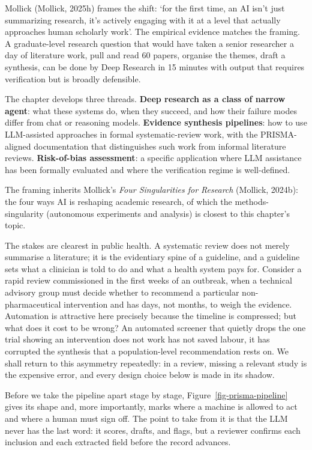 \documentclass[
  letterpaper,
  11pt]{scrbook}
\begin{document}
Mollick (Mollick, 2025h) frames the shift: `for the first time, an AI
isn't just summarizing research, it's actively engaging with it at a
level that actually approaches human scholarly work'. The empirical
evidence matches the framing. A graduate-level research question that
would have taken a senior researcher a day of literature work, pull and
read 60 papers, organise the themes, draft a synthesis, can be done by
Deep Research in 15 minutes with output that requires verification but
is broadly defensible.

The chapter develops three threads. \textbf{Deep research as a class of
narrow agent}: what these systems do, when they succeed, and how their
failure modes differ from chat or reasoning models. \textbf{Evidence
synthesis pipelines}: how to use LLM-assisted approaches in formal
systematic-review work, with the PRISMA-aligned documentation that
distinguishes such work from informal literature reviews.
\textbf{Risk-of-bias assessment}: a specific application where LLM
assistance has been formally evaluated and where the verification regime
is well-defined.

The framing inherits Mollick's \emph{Four Singularities for Research}
(Mollick, 2024b): the four ways AI is reshaping academic research, of
which the methods-singularity (autonomous experiments and analysis) is
closest to this chapter's topic.

The stakes are clearest in public health. A systematic review does not
merely summarise a literature; it is the evidentiary spine of a
guideline, and a guideline sets what a clinician is told to do and what
a health system pays for. Consider a rapid review commissioned in the
first weeks of an outbreak, when a technical advisory group must decide
whether to recommend a particular non-pharmaceutical intervention and
has days, not months, to weigh the evidence. Automation is attractive
here precisely because the timeline is compressed; but what does it cost
to be wrong? An automated screener that quietly drops the one trial
showing an intervention does not work has not saved labour, it has
corrupted the synthesis that a population-level recommendation rests on.
We shall return to this asymmetry repeatedly: in a review, missing a
relevant study is the expensive error, and every design choice below is
made in its shadow.

Before we take the pipeline apart stage by stage,
Figure~\ref{fig-prisma-pipeline} gives its shape and, more importantly,
marks where a machine is allowed to act and where a human must sign off.
The point to take from it is that the LLM never has the last word: it
scores, drafts, and flags, but a reviewer confirms each inclusion and
each extracted field before the record advances.
\end{document}
